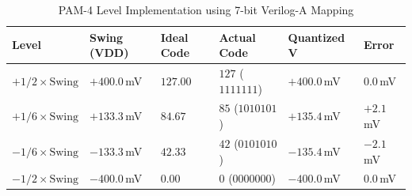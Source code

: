 \documentclass[12pt, a4paper]{report}
\begin{document}
\begin{table}[htbp]
    \centering
    \caption{PAM-4 Level Implementation using 7-bit Verilog-A Mapping}
    \label{tab:pam4_veriloga_mapping}
    \begin{tabular}{l l l l l l}
        \toprule
        \textbf{Level} & \textbf{Swing (VDD)} & \textbf{Ideal Code} & \textbf{Actual Code} & \textbf{Quantized V} & \textbf{Error} \\
        \midrule
        $+1/2 \times \text{Swing}$ & $+400.0\,$mV & $127.00$ & $127$ ($1111111$) & $+400.0\,$mV & $0.0\,$mV \\
        $+1/6 \times \text{Swing}$ & $+133.3\,$mV & $84.67$ & $85$ ($1010101$) & $+135.4\,$mV & $+2.1\,$mV \\
        $-1/6 \times \text{Swing}$ & $-133.3\,$mV & $42.33$ & $42$ ($0101010$) & $-135.4\,$mV & $-2.1\,$mV \\
        $-1/2 \times \text{Swing}$ & $-400.0\,$mV & $0.00$ & $0$ ($0000000$) & $-400.0\,$mV & $0.0\,$mV \\
        \bottomrule
    \end{tabular}
\end{table}
\end{document}
